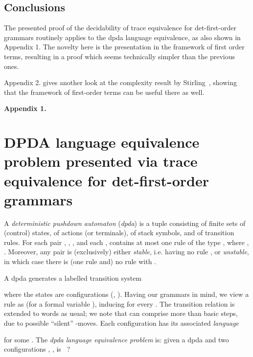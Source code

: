 \documentclass[12pt]{article}
\begin{document}
\subsection*{Conclusions}


The presented proof of the decidability of trace equivalence for
det-first-order grammars routinely applies 
to the dpda language equivalence, as also shown in Appendix 1. 
The novelty here is the presentation in the framework of first order terms,
resulting in a proof which seems technically simpler than the previous
ones. 


Appendix 2. gives another look at the complexity result by 
Stirling~\cite{Stir:DPDA:prim}, showing that the
framework of first-order terms can be useful there as well.  















\noindent
\textbf{Appendix 1.}


\section{DPDA 
language
equivalence problem presented via
trace equivalence for det-first-order grammars}

A \emph{deterministic pushdown automaton} (\emph{dpda})
is a tuple 
 consisting of
finite sets  of (control) states, 
 of actions (or terminals),
 of stack symbols, and  of transition rules.
For each pair , , , and each 
,  contains at most one rule
of the type  , where , .
Moreover, any pair  is (exclusively) either \emph{stable}, 
i.e. 
having no rule 
, or
\emph{unstable}, in which case there
is (one rule  and) no rule
 with .

A dpda  generates a labelled transition system

where the states are
configurations   (, ).
Having our grammars in mind, we view a rule 
as  (for a formal variable ), inducing
 for every . 
The transition relation is extended to words  
as usual; we note that  
can comprise more than   basic steps, due
to possible ``silent'' -moves.
Each configuration 
has its associated \emph{language}

for some .
The \emph{dpda language equivalence problem} is:  
given a dpda  and two configurations
, ,
is ~?
\end{document}
